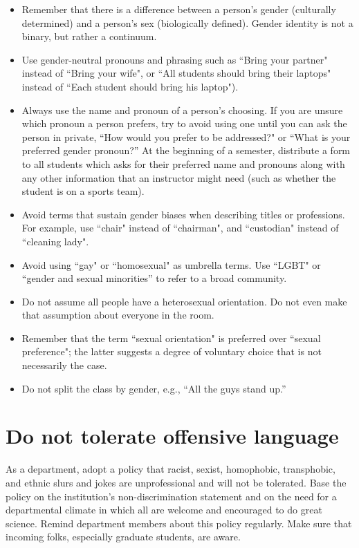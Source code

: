 \begin{itemize}
	\item Remember that there is a difference between a person's gender (culturally determined) and a person's sex (biologically defined). Gender identity is not a binary, but rather a continuum.
	\item {Use gender-neutral pronouns and phrasing} such as ``Bring your partner" instead of ``Bring your wife", or ``All students should bring their laptops" instead of ``Each student should bring his laptop").
	\item {Always use the name and pronoun of a person's choosing}. If you are unsure which pronoun a person prefers, try to avoid using one until you can ask the person in private, ``How would you prefer to be addressed?" or ``What is your preferred gender pronoun?''  At the beginning of a semester, distribute a form to all students which asks for their preferred name and pronouns along with any other information that an instructor might need (such as whether the student is on a sports team).
	\item {Avoid terms that sustain gender biases when describing titles or professions}. For example, use ``chair" instead of ``chairman", and ``custodian" instead of ``cleaning lady".
	\item Avoid using ``gay" or ``homosexual" as umbrella terms.  Use ``LGBT" or ``gender and sexual minorities'' to refer to a broad community.
	\item {Do not assume all people have a heterosexual orientation}.  Do not even make that assumption about everyone in the room.
	\item Remember that the term ``sexual orientation" is preferred over ``sexual preference"; the latter suggests a degree of voluntary choice that is not necessarily the case.
	\item Do not split the class by gender, e.g., ``All the guys stand up.''
\end{itemize}


\section {Do not tolerate offensive language}
\label{offensive-language}
As a department, adopt a policy that racist, sexist, homophobic, transphobic, and ethnic slurs and jokes are unprofessional and will not be tolerated.  Base the policy on the institution's non-discrimination statement and on the need for a departmental climate in which all are welcome and encouraged to do great science.  Remind department members about this policy regularly.  Make sure that incoming folks, especially graduate students, are aware.

